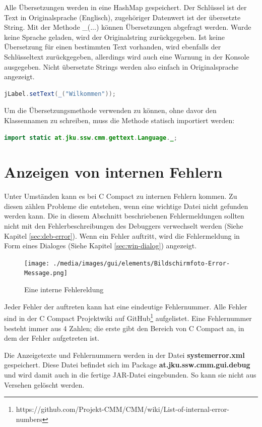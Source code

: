 Alle Übersetzungen werden in eine HashMap gespeichert. Der Schlüssel ist der Text in Originalsprache (Englisch), zugehöriger Datenwert ist der übersetzte String. Mit der Methode \glqq{}\_(...)\grqq{} können Übersetzungen abgefragt werden. Wurde keine Sprache geladen, wird der Originalstring zurückgegeben. Ist keine Übersetzung für einen bestimmten Text vorhanden, wird ebenfalls der Schlüsseltext zurückgegeben, allerdings wird auch eine Warnung in der Konsole ausgegeben. Nicht übersetzte Strings werden also einfach in Originalsprache angezeigt.
\begin{lstlisting}[language=JAVA]
jLabel.setText(_("Wilkommen"));
\end{lstlisting}

Um die Übersetzungsmethode verwenden zu können, ohne davor den Klassennamen zu schreiben, muss die Methode statisch importiert werden:
\begin{lstlisting}[language=JAVA]
import static at.jku.ssw.cmm.gettext.Language._;
\end{lstlisting}

\section{Anzeigen von internen Fehlern}
\label{sec:gui-int-error}
Unter Umständen kann es bei C Compact zu internen Fehlern kommen. Zu diesen zählen Probleme die entstehen, wenn eine wichtige Datei nicht gefunden werden kann. Die in diesem Abschnitt beschriebenen Fehlermeldungen sollten nicht mit den Fehlerbeschreibungen des Debuggers verwechselt werden (Siehe Kapitel \ref{sec:deb-error}). Wenn ein Fehler auftritt, wird die Fehlermeldung in Form eines Dialoges (Siehe Kapitel \ref{sec:win-dialog}) angezeigt.

\begin{figure}[htp]
\centering
\texttt{[image: ./media/images/gui/elements/Bildschirmfoto-Error-Message.png]}
\caption{Eine interne Fehlereldung}
\end{figure}

Jeder Fehler der auftreten kann hat eine eindeutige Fehlernummer. Alle Fehler sind in der C Compact Projektwiki auf GitHub\footnote{https://github.com/Projekt-CMM/CMM/wiki/List-of-internal-error-numbers} aufgelistet. Eine Fehlernummer besteht immer aus 4 Zahlen; die erste gibt den Bereich von C Compact an, in dem der Fehler aufgetreten ist.

Die Anzeigetexte und Fehlernummern werden in der Datei \textbf{systemerror.xml} gespeichert. Diese Datei befindet sich im Package \textbf{at.jku.ssw.cmm.gui.debug} und wird damit auch in die fertige JAR-Datei eingebunden. So kann sie nicht aus Versehen gelöscht werden.

